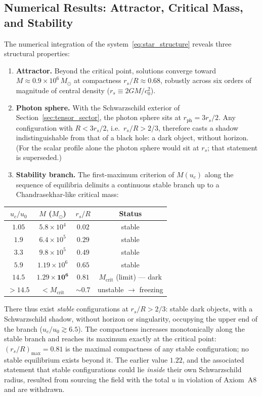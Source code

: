 \documentclass[11pt,a4paper]{article}
\theoremstyle{plain}
\theoremstyle{remark}
\begin{document}
\subsection{Numerical Results: Attractor, Critical Mass, and Stability}
The numerical integration of the system~\eqref{eq:star_structure} reveals three structural properties:
\begin{enumerate}
    \item \textbf{Attractor.} Beyond the critical point, solutions converge toward $M \approx 0.9\times10^{6}\,M_\odot$ at compactness $r_s/R \approx 0.68$, robustly across six orders of magnitude of central density ($r_s \equiv 2GM/c_0^2$).
    \item \textbf{Photon sphere.} With the Schwarzschild exterior of Section~\ref{sec:tensor_sector}, the photon sphere sits at $r_{\text{ph}} = 3r_s/2$. Any configuration with $R < 3r_s/2$, i.e.\ $r_s/R > 2/3$, therefore casts a shadow indistinguishable from that of a black hole: a dark object, without horizon. (For the scalar profile alone the photon sphere would sit at $r_s$; that statement is superseded.)
    \item \textbf{Stability branch.} The first-maximum criterion of $M(u_c)$ along the sequence of equilibria delimits a continuous stable branch up to a Chandrasekhar-like critical mass:
\end{enumerate}

\begin{center}
\begin{tabular}{cccc}
\toprule
$u_c/u_0$ & $M$ ($M_\odot$) & $r_s/R$ & Status \\
\midrule
$1.05$ & $5.8\times10^{4}$ & $0.02$ & stable \\
$1.9$ & $6.4\times10^{5}$ & $0.29$ & stable \\
$3.3$ & $9.8\times10^{5}$ & $0.49$ & stable \\
$5.9$ & $1.19\times10^{6}$ & $0.65$ & stable \\
$14.5$ & $\mathbf{1.29\times10^{6}}$ & $0.81$ & $M_{\text{crit}}$ (limit) --- dark \\
$>14.5$ & $< M_{\text{crit}}$ & $\sim0.7$ & unstable $\to$ freezing \\
\bottomrule
\end{tabular}
\end{center}

There thus exist \emph{stable} configurations at $r_s/R > 2/3$: stable dark objects, with a Schwarzschild shadow, without horizon or singularity, occupying the upper end of the branch ($u_c/u_0 \gtrsim 6.5$). The compactness increases monotonically along the stable branch and reaches its maximum exactly at the critical point: $\left(r_s/R\right)_{\max} = 0.81$ is the maximal compactness of any stable configuration; no stable equilibrium exists beyond it. The earlier value $1.22$, and the associated statement that stable configurations could lie \emph{inside} their own Schwarzschild radius, resulted from sourcing the field with the total $u$ in violation of Axiom~A8 and are withdrawn.
\end{document}
